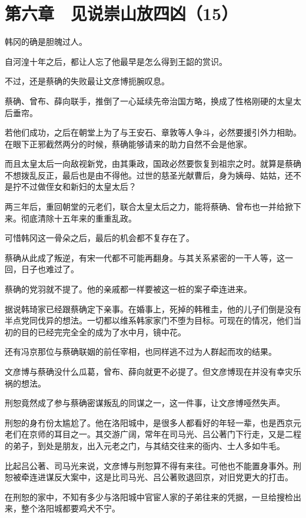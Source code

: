 \section{第六章　见说崇山放四凶（15）}

韩冈的确是胆魄过人。

自河湟十年之后，都让人忘了他最早是怎么得到王韶的赏识。

不过，还是蔡确的失败最让文彦博扼腕叹息。

蔡确、曾布、薛向联手，推倒了一心延续先帝治国方略，换成了性格刚硬的太皇太后垂帘。

若他们成功，之后在朝堂上为了与王安石、章敦等人争斗，必然要援引外力相助。在眼下正邪截然两分的时候，蔡确能够请来的助力自然不会是他家。

而且太皇太后一向敌视新党，由其秉政，国政必然要恢复到祖宗之时。就算是蔡确不想拨乱反正，最后也是由不得他。过世的慈圣光献曹后，身为姨母、姑姑，还不是拧不过做侄女和新妇的太皇太后？

两三年后，重回朝堂的元老们，联合太皇太后之力，能将蔡确、曾布也一并给掀下来。彻底清除十五年来的重重乱政。

可惜韩冈这一骨朵之后，最后的机会都不复存在了。

蔡确从此成了叛逆，有宋一代都不可能再翻身。与其关系紧密的一干人等，这一回，日子也难过了。

蔡确的党羽就不提了。他的亲戚都一样要被这一桩的案子牵连进来。

据说韩琦家已经跟蔡确定下亲事。在婚事上，死掉的韩稚圭，他的儿子们倒是没有半点党同伐异的想法。一切都以维系韩家家门不堕为目标。可现在的情况，他们当初的目的已经完完全全的成为了水中月，镜中花。

还有冯京那位与蔡确联姻的前任宰相，也同样逃不过为人群起而攻的结果。

文彦博与蔡确没什么瓜葛，曾布、薛向就更不必提了。但文彦博现在并没有幸灾乐祸的想法。

刑恕竟然成了参与蔡确密谋叛乱的同谋之一，这一件事，让文彦博哑然失声。

刑恕的身冇份太尴尬了。他在洛阳城中，是很多人都看好的年轻一辈，也是西京元老们在京师的耳目之一。其交游广阔，常年在司马光、吕公著门下行走，又是二程的弟子，到处是朋友，出入元老之门，与其结交往来的衙内、士人多如牛毛。

比起吕公著、司马光来说，文彦博与刑恕算不得有来往。可他也不能置身事外。刑恕被牵连进谋反大案中，这是比司马光、吕公著败退回京，对旧党更大的打击。

在刑恕的家中，不知有多少与洛阳城中官宦人家的子弟往来的凭据，一旦给搜检出来，整个洛阳城都要鸡犬不宁。

